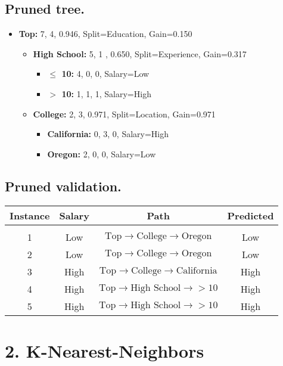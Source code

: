 \documentclass[12pt]{article}
\begin{document}
	\subsection*{Pruned tree.}
	\begin{itemize}
		\item[] \textbf{Top:} 7, 4, 0.946, Split=Education, Gain=0.150
		\begin{itemize}
			\item[] \textbf{High School:} 5, 1 , 0.650, Split=Experience, Gain=0.317
			\begin{itemize}
				\item[] \textbf{$\leq$ 10:} 4, 0, 0, Salary=Low
				\item[] \textbf{$>$ 10:} 1, 1, 1, Salary=High
			\end{itemize}
			\item[] \textbf{College:} 2, 3, 0.971, Split=Location, Gain=0.971
			\begin{itemize}
				\item[] \textbf{California:}  0, 3, 0, Salary=High
				\item[] \textbf{Oregon:} 2, 0, 0, Salary=Low
			\end{itemize}
		\end{itemize}
	\end{itemize}
	
	\subsection*{Pruned validation.}
	\begin{tabular}{c | c | c | c}
		Instance & Salary & Path & Predicted \\
		\hline & & & \\
		1 & Low & $\textrm{Top}\rightarrow\textrm{College}\rightarrow\textrm{Oregon}$ & Low \\
		2 & Low & $\textrm{Top}\rightarrow\textrm{College}\rightarrow\textrm{Oregon}$ & Low \\
		3 & High & $\textrm{Top}\rightarrow\textrm{College}\rightarrow\textrm{California}$ & High \\
		4 & High & $\textrm{Top}\rightarrow\textrm{High School}\rightarrow>10$ & High \\
		5 & High & $\textrm{Top}\rightarrow\textrm{High School}\rightarrow>10$ & High
	\end{tabular}
	
	\section*{2. K-Nearest-Neighbors}
\end{document}
